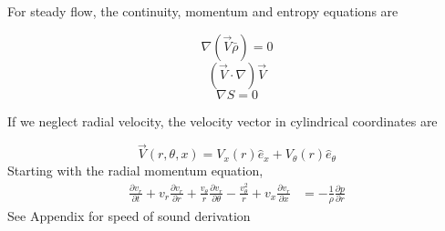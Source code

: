 For steady flow, the continuity, momentum and entropy equations are

\[\nabla (\vec{V} \bar{\rho}) = 0\]
\[(\vec{V}\cdot \nabla) \vec{V}\]
\[\nabla S = 0\]

If we neglect radial velocity, the velocity vector in cylindrical coordinates are

\[\vec{V}(r,\theta,x) = V_x(r) \hat{e}_x + V_{\theta} (r) \hat{e}_{\theta} \]
Starting with the radial momentum equation, 
\begin{align*}
\frac{\partial v_r}{\partial t} + 
v_r \frac{\partial v_r}{\partial r} +
\frac{v_{\theta}  }{r}
\frac{\partial v_r}{\partial \theta}- \frac{v_{\theta}^2}{r}+ 
v_x \frac{\partial v_r}{\partial x} 
&= -\frac{1}{\rho} \frac{\partial p}{\partial r} 
\end{align*}
See Appendix for speed of sound derivation
